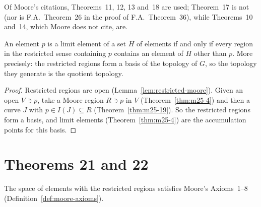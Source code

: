 
Of Moore's citations, Theorems~11, 12, 13 and~18 are used; Theorem~17 is not (nor is F.A.\ Theorem~26 in the
proof of F.A.\ Theorem~36), while Theorems~10 and~14, which Moore does not cite, are.

\begin{theorem}\label{thm:m25-20}
An element $p$ is a limit element of a set $H$ of elements if and only if every region in the restricted sense
containing $p$ contains an element of $H$ other than $p$. More precisely: the restricted regions form a basis of the
topology of $G$, so the topology they generate is the quotient topology.
\end{theorem}

\begin{proof}
Restricted regions are open (Lemma~\ref{lem:restricted-moore}). Given an open $V\ni p$, take a Moore region
$R\ni p$ in $V$ (Theorem~\ref{thm:m25-4}) and then a curve $J$ with $p\in I(J)\subseteq R$ (Theorem~\ref{thm:m25-19}).
So the restricted regions form a basis, and limit elements (Theorem~\ref{thm:m25-4}) are the accumulation
points for this basis.
\end{proof}


\section{Theorems 21 and 22}

\begin{theorem}\label{thm:m25-21}
The space of elements with the restricted regions satisfies Moore's Axioms~1--8
(Definition~\ref{def:moore-axioms}).
\end{theorem}

